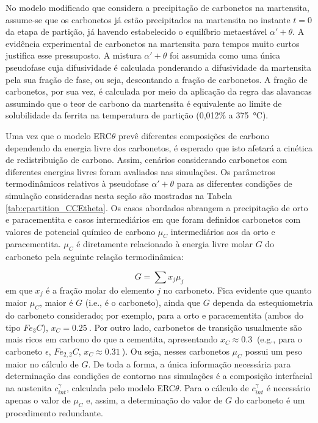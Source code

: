No modelo modificado que considera a precipitação de carbonetos na martensita, assume-se que os carbonetos já estão precipitados na martensita no instante $t = 0$ da etapa de partição, já havendo estabelecido o equilíbrio metaestável $\alpha' + \theta$.
A evidência experimental de carbonetos na martensita para tempos muito curtos justifica esse pressuposto.
A mistura $\alpha' + \theta$ foi assumida como uma única pseudofase cuja difusividade é calculada ponderando a difusividade da martensita pela sua fração de fase, ou seja, descontando a fração de carbonetos. A fração de carbonetos, por sua vez, é calculada por meio da aplicação da regra das alavancas assumindo 
que o teor de carbono da martensita é equivalente ao limite de solubilidade da ferrita na temperatura de partição (0,012\% a \SI{375}{\degreeCelsius}). 

Uma vez que o modelo ERC$\theta$ prevê diferentes composições de carbono dependendo da energia livre dos carbonetos, é esperado que isto afetará a cinética de redistribuição de carbono. Assim, cenários considerando carbonetos com diferentes energias livres foram avaliados nas simulações. Os parâmetros termodinâmicos relativos à pseudofase $\alpha' + \theta$ para as diferentes condições de simulação consideradas nesta seção são mostradas na Tabela \ref{tab:cpartition_CCEtheta}. Os casos abordados abrangem a precipitação de orto e paracementita e casos intermediários em que foram definidos carbonetos com valores de potencial químico de carbono $\mu_C$ intermediários aos da orto e paracementita. $\mu_C$ é diretamente relacionado à energia livre molar $G$ do carboneto pela seguinte relação termodinâmica:

\begin{equation}
  G = \sum x_j \mu_j
\end{equation} 
%
em que $x_j$ é a fração molar do elemento $j$ no carboneto. Fica evidente que quanto maior $\mu_C$, maior é $G$ (i.e.,  é o carboneto), ainda que $G$ dependa da estequiometria do carboneto considerado; por exemplo, para a orto e paracementita (ambos do tipo $Fe_3C$), $x_C = \SI{0.25}{}$. Por outro lado, carbonetos de transição usualmente são mais ricos em carbono do que a cementita, apresentando $x_C \approx \SI{0.3}{}$ (e.g., para o carboneto $\epsilon$, $Fe_{2,2}C$, $x_C \approx \SI{0.31}{}$). Ou seja, nesses carbonetos $\mu_C$ possui um peso maior no cálculo de $G$. De toda a forma, a única informação necessária para determinação das condições de contorno nas simulações é a composição interfacial na austenita $c^\gamma_{int}$, calculada pelo modelo ERC$\theta$. Para o cálculo de $c^\gamma_{int}$ é necessário apenas o valor de $\mu_C$ e, assim, a determinação do valor de $G$ do carboneto é um procedimento redundante.

